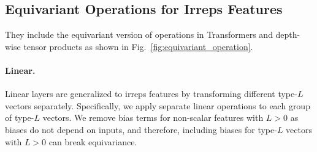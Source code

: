 \vspace{-2.5mm}
\subsection{Equivariant Operations for Irreps Features}
\vspace{-2.5mm}
\label{subsec:equivariant_operations}

They include the equivariant version of operations in Transformers and depth-wise tensor products as shown in Fig.~\ref{fig:equivariant_operation}. %




\vspace{-2.5mm}
\paragraph{Linear.}
Linear layers are generalized to irreps features by transforming different type-$L$ vectors separately.
Specifically, we apply separate linear operations to each group of type-$L$ vectors.
We remove bias terms for non-scalar features with $L > 0$ as biases do not depend on inputs, and therefore, including biases for type-$L$ vectors with $L > 0$ can break equivariance.

